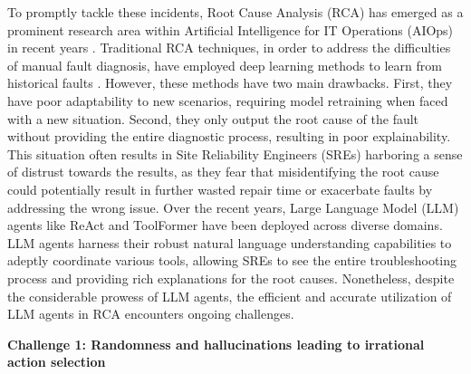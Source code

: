 


To promptly tackle these incidents, Root Cause Analysis (RCA) has emerged as a prominent research area within Artificial Intelligence for IT Operations (AIOps) in recent years \cite{rca1,rca2,rca3,rca4}. Traditional RCA techniques, in order to address the difficulties of manual fault diagnosis, have employed deep learning methods to learn from historical faults \citep{li2022dejavu}. However, these methods have two main drawbacks. First, they have poor adaptability to new scenarios, requiring model retraining when faced with a new situation. Second, they only output the root cause of the fault without providing the entire diagnostic process, resulting in poor explainability. This situation often results in Site Reliability Engineers (SREs) harboring a sense of distrust towards the results, as they fear that misidentifying the root cause could potentially result in further wasted repair time or exacerbate faults by addressing the wrong issue. Over the recent years, Large Language Model (LLM) agents like ReAct \citep{yao2022react} and ToolFormer \citep{schick2024toolformer} have been deployed across diverse domains. LLM agents harness their robust natural language understanding capabilities to adeptly coordinate various tools, allowing SREs to see the entire troubleshooting process and providing rich explanations for the root causes. Nonetheless, despite the considerable prowess of LLM agents, the efficient and accurate utilization of LLM agents in RCA encounters ongoing challenges.

\noindent\textbf{Challenge 1: Randomness and hallucinations leading to irrational action selection}


